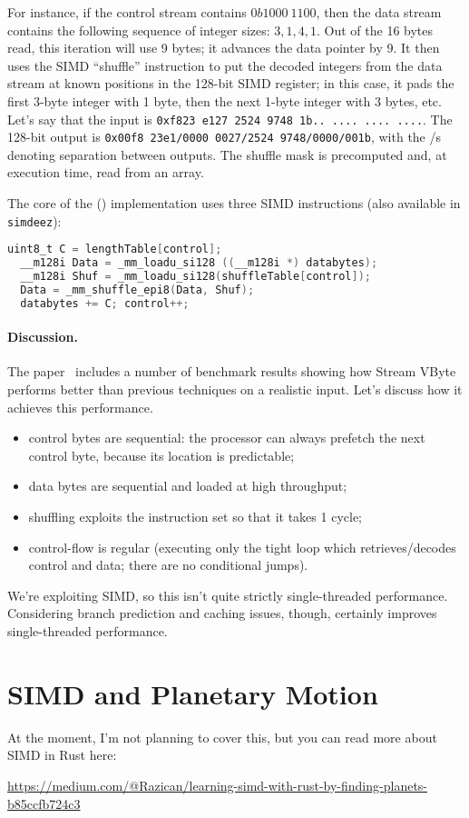 For instance, if the control stream contains $0b1000~1100$, then the data stream
contains the following sequence of integer sizes: $3, 1, 4, 1$. Out of the 16 bytes read,
this iteration will use 9 bytes; it advances the data pointer by 9. It then uses the SIMD
``shuffle'' instruction to put the decoded integers from the data stream at known positions in the
128-bit SIMD register; in this case, it pads the first 3-byte integer with 1 byte, then
the next 1-byte integer with 3 bytes, etc. Let's say that the input is
{\tt 0xf823~e127~2524~9748~1b..~....~....~....}. The 128-bit output is
{\tt 0x00f8~23e1/0000~0027/2524 9748/0000/001b}, with the /s denoting separation
between outputs. The shuffle mask is precomputed and, at
execution time, read from an array.

The core of the (\CPP) implementation uses three SIMD instructions (also available in \texttt{simdeez}):
\begin{lstlisting}[language=C]
  uint8_t C = lengthTable[control];
  __m128i Data = _mm_loadu_si128 ((__m128i *) databytes);
  __m128i Shuf = _mm_loadu_si128(shuffleTable[control]);
  Data = _mm_shuffle_epi8(Data, Shuf);
  databytes += C; control++;
\end{lstlisting}

\paragraph{Discussion.} The paper~\cite{LEMIRE20181} includes a number of benchmark results
showing how Stream VByte performs better than previous techniques on a realistic input.
Let's discuss how it achieves this performance.

\begin{itemize}[noitemsep]
\item control bytes are sequential: the processor can always prefetch the next control byte, because
its location is predictable;
\item data bytes are sequential and loaded at high throughput;
\item shuffling exploits the instruction set so that it takes 1 cycle;
\item control-flow is regular (executing only the tight loop which retrieves/decodes control
and data; there are no conditional jumps).
\end{itemize}
We're exploiting SIMD, so this isn't quite strictly single-threaded performance.
Considering branch prediction and caching issues, though,
certainly improves single-threaded performance.

\section*{SIMD and Planetary Motion}

At the moment, I'm not planning to cover this, but you can read more about SIMD
in Rust here:
\begin{center}
\url{https://medium.com/@Razican/learning-simd-with-rust-by-finding-planets-b85ccfb724c3}
\end{center}




